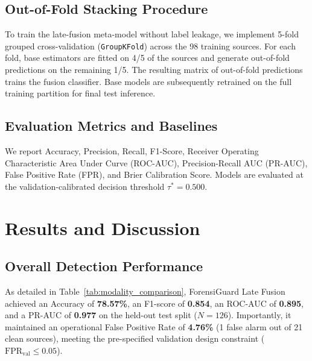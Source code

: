 \documentclass[conference]{IEEEtran}
\begin{document}
\subsection{Out-of-Fold Stacking Procedure}
To train the late-fusion meta-model without label leakage, we implement 5-fold grouped cross-validation (\texttt{GroupKFold}) across the 98 training sources. For each fold, base estimators are fitted on 4/5 of the sources and generate out-of-fold predictions on the remaining 1/5. The resulting matrix of out-of-fold predictions trains the fusion classifier. Base models are subsequently retrained on the full training partition for final test inference.

\subsection{Evaluation Metrics and Baselines}
We report Accuracy, Precision, Recall, F1-Score, Receiver Operating Characteristic Area Under Curve (ROC-AUC), Precision-Recall AUC (PR-AUC), False Positive Rate (FPR), and Brier Calibration Score. Models are evaluated at the validation-calibrated decision threshold $\tau^* = 0.500$.

\section{Results and Discussion}



\subsection{Overall Detection Performance}
As detailed in Table~\ref{tab:modality_comparison}, ForensiGuard Late Fusion achieved an Accuracy of \textbf{78.57\%}, an F1-score of \textbf{0.854}, an ROC-AUC of \textbf{0.895}, and a PR-AUC of \textbf{0.977} on the held-out test split ($N=126$). Importantly, it maintained an operational False Positive Rate of \textbf{4.76\%} (1 false alarm out of 21 clean sources), meeting the pre-specified validation design constraint ($\text{FPR}_{\text{val}} \le 0.05$).
\end{document}
